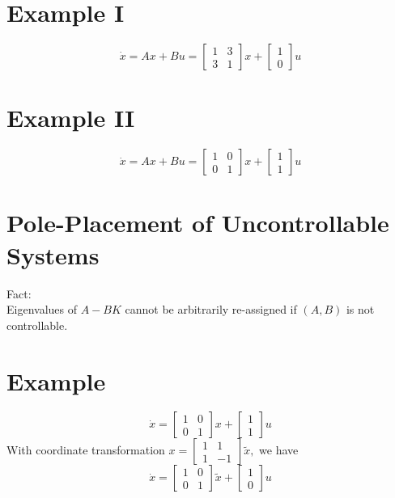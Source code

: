 \documentclass[10pt,a4paper,oneside]{article}
\begin{document}
\section{Example I}
\[
\dot{x}=A x+B u=\left[\begin{array}{ll}{1} & {3} \\ {3} & {1}\end{array}\right] x+\left[\begin{array}{l}{1} \\ {0}\end{array}\right] u
\]
\section{Example II}
\[
\dot{x}=A x+B u=\left[\begin{array}{ll}{1} & {0} \\ {0} & {1}\end{array}\right] x+\left[\begin{array}{l}{1} \\ {1}\end{array}\right] u
\]
\section{Pole-Placement of Uncontrollable Systems}
Fact:\\
Eigenvalues of $A-BK$ cannot be arbitrarily re-assigned if $(A,B)$ is not controllable.
\section{Example}
\[
\dot{x}=\left[\begin{array}{ll}{1} & {0} \\ {0} & {1}\end{array}\right] x+\left[\begin{array}{l}{1} \\ {1}\end{array}\right] u
\]
With coordinate transformation $x=\left[\begin{array}{cc}{1} & {1} \\ {1} & {-1}\end{array}\right] \tilde{x},$ we have
\[
\dot{x}=\left[\begin{array}{ll}{1} & {0} \\ {0} & {1}\end{array}\right] \tilde{x}+\left[\begin{array}{l}{1} \\ {0}\end{array}\right] u
\]
\end{document}
